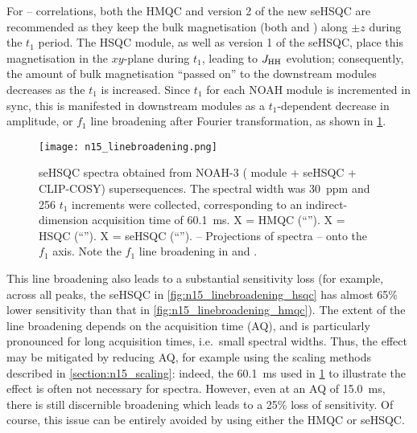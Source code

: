 For \proton{}--\nitrogen{} correlations, both the HMQC and version 2 of the new seHSQC are recommended as they keep the bulk magnetisation (both  and ) along $\pm z$ during the $t_1$ period.
The HSQC module, as well as version 1 of the seHSQC, place this magnetisation in the $xy$-plane during $t_1$, leading to $\jhh$ evolution; consequently, the amount of bulk magnetisation ``passed on'' to the downstream modules decreases as the \nitrogen{} $t_1$ is increased.
Since $t_1$ for each NOAH module is incremented in sync, this is manifested in downstream modules as a $t_1$-dependent decrease in amplitude, or $f_1$ line broadening after Fourier transformation, as shown in \cref{fig:n15_linebroadening}.

\begin{figure}
    \centering
    \texttt{[image: n15\_linebroadening.png]}
    {\label{fig:n15_linebroadening_hmqc}}
    {\label{fig:n15_linebroadening_hsqc}}
    {\label{fig:n15_linebroadening_spv2}}
    {\label{fig:n15_linebroadening_hmqc_f2proj}}
    {\label{fig:n15_linebroadening_hsqc_f2proj}}
    {\label{fig:n15_linebroadening_spv2_f2proj}}
    \caption{
        \carbon{} seHSQC spectra obtained from NOAH-3  (\nitrogen{} module + \carbon{} seHSQC + CLIP-COSY) supersequences.
        The \nitrogen{} spectral width was \SI{30}{ppm} and 256 $t_1$ increments were collected, corresponding to an indirect-dimension \nitrogen{} acquisition time of \SI{60.1}{\ms}.
        \textbf{} X = HMQC (``\noahM{}'').
        \textbf{} X = HSQC (``\noahS{}'').
        \textbf{} X = seHSQC (``\noahSpn{}'').
        \textbf{}--\textbf{} Projections of spectra \textbf{}--\textbf{} onto the $f_1$ axis.
        Note the $f_1$ line broadening in  and .
        \grami{}
    }
    \label{fig:n15_linebroadening}
\end{figure}

This line broadening also leads to a substantial sensitivity loss (for example, across all peaks, the \carbon{} seHSQC in \cref{fig:n15_linebroadening_hsqc} has almost 65\% lower sensitivity than that in \cref{fig:n15_linebroadening_hmqc}).
The extent of the line broadening depends on the acquisition time (AQ), and is particularly pronounced for long acquisition times, i.e.\ small \nitrogen{} spectral widths.
Thus, the effect may be mitigated by reducing AQ, for example using the scaling methods described in \cref{section:n15_scaling}: indeed, the \SI{60.1}{\ms} used in \cref{fig:n15_linebroadening} to illustrate the effect is often not necessary for \nitrogen{} spectra.
However, even at an AQ of \SI{15.0}{\ms}, there is still discernible broadening which leads to a 25\% loss of sensitivity.
Of course, this issue can be entirely avoided by using either the HMQC or seHSQC.

